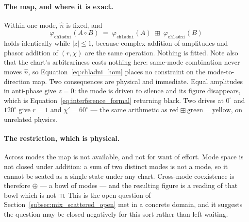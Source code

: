 \documentclass[12pt, a4paper]{article}
\begin{document}
\paragraph{The map, and where it is exact.}
Within one mode, $\hat n$ is fixed, and
\begin{equation}
    \varphi_{\mathtt{chladni}}(A\circ B)
    \;=\;
    \varphi_{\mathtt{chladni}}(A)\;\boxplus\;\varphi_{\mathtt{chladni}}(B)
    \label{eq:chladni_hom}
\end{equation}
holds identically while $|z|\le 1$, because complex addition of
amplitudes and phasor addition of $(r,\chi)$ are the same operation.
Nothing is fitted. Note also that the chart's arbitrariness costs
nothing here: same-mode combination never moves $\hat n$, so
Equation~\eqref{eq:chladni_hom} places no constraint on the
mode-to-direction map. Two consequences are physical and immediate.
Equal amplitudes in anti-phase give $z=0$: the mode is driven to
silence and its figure disappears, which is
Equation~\eqref{eq:interference_formal} returning black. Two drives at
$0^\circ$ and $120^\circ$ give $r=1$ and $\chi'=60^\circ$ --- the same
arithmetic as $\mathrm{red}\boxplus\mathrm{green}=\mathrm{yellow}$,
on unrelated physics.

\paragraph{The restriction, which is physical.}
Across modes the map is not available, and not for want of effort.
Mode space is not closed under addition: a sum of two distinct modes
is not a mode, so it cannot be seated as a single state under any
chart. Cross-mode coexistence is therefore $\oplus$ --- a bowl of
modes --- and the resulting figure is a reading of that bowl which is
not $\boxplus$. This is the open question of
Section~\ref{subsec:mix_scattered_open} met in a concrete domain, and
it suggests the question may be closed negatively for this sort rather
than left waiting.
\end{document}
